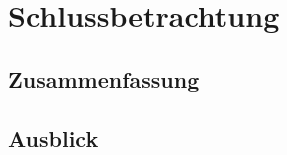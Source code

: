 \chapter{Schlussbetrachtung}
\label{chap:conclusion}

\section{Zusammenfassung}

\section{Ausblick}

